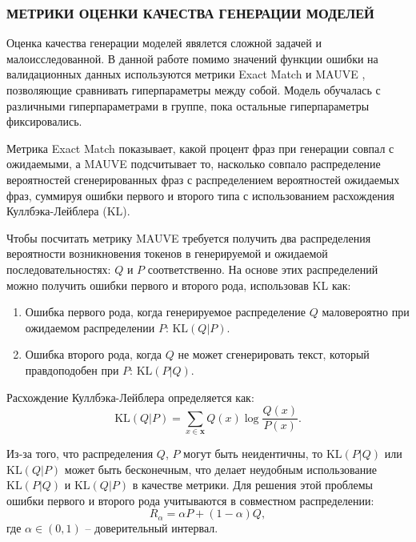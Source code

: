 \subsubsection{МЕТРИКИ ОЦЕНКИ КАЧЕСТВА ГЕНЕРАЦИИ МОДЕЛЕЙ}

Оценка качества генерации моделей явялется сложной задачей и малоисследованной. В данной работе помимо значений функции ошибки на валидационных данных используются метрики Exact Match и MAUVE \cite{mauve-paper}, позволяющие сравнивать гиперпараметры между собой. Модель обучалась с различными гиперпараметрами в группе, пока остальные гиперпараметры фиксировались.

Метрика Exact Match показывает, какой процент фраз при генерации совпал с ожидаемыми, а MAUVE подсчитывает то, насколько совпало распределение вероятностей сгенерированных фраз с распределением вероятностей ожидаемых фраз, суммируя ошибки первого и второго типа с использованием расхождения Куллбэка-Лейблера (KL).

Чтобы посчитать метрику MAUVE требуется получить два распределения вероятности возникновения токенов в генерируемой и ожидаемой последовательностях: $Q$ и $P$ соответственно. На основе этих распределений можно получить ошибки первого и второго рода, использовав KL как:
\begin{enumerate}
  \item Ошибка первого рода, когда генерируемое распределение $Q$ маловероятно при ожидаемом распределении $P$: $\text{KL}(Q \vert P)$.
  \item Ошибка второго рода, когда $Q$ не может сгенерировать текст, который правдоподобен при $P$: $\text{KL}(P \vert Q)$.
\end{enumerate} Расхождение Куллбэка-Лейблера определяется как:
\begin{equation}
  \text{KL}(Q \vert P) = \sum_{x \in \mathbf{x}}{Q(x) \log{\frac{Q(x)}{P(x)}}}.
\end{equation}

Из-за того, что распределения $Q$, $P$ могут быть неидентичны, то $\text{KL}(P \vert Q)$ или $\text{KL}(Q \vert P)$ может быть бесконечным, что делает неудобным использование $\text{KL}(P \vert Q)$ и $\text{KL}(Q \vert P)$ в качестве метрики. Для решения этой проблемы ошибки первого и второго рода учитываются в совместном распределении: 
\begin{equation}
  R_{\alpha} = \alpha P + (1 - \alpha)Q,
\end{equation} где $\alpha \in (0, 1)$ -- доверительный интервал.

